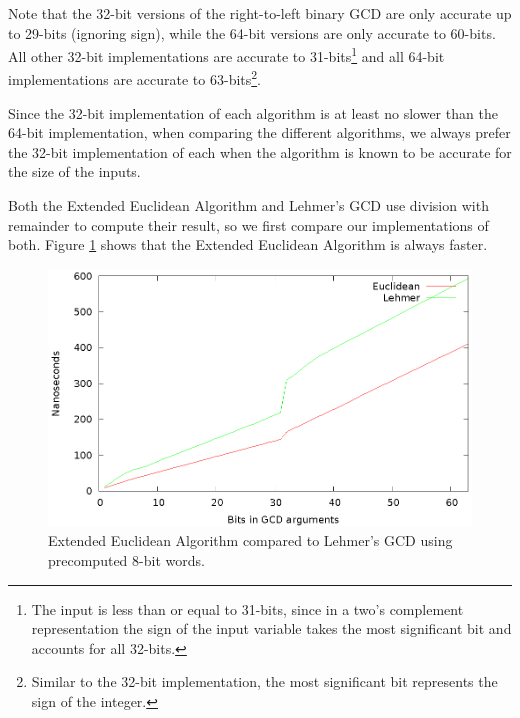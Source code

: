 \documentclass{ucalgthes1}
\theoremstyle{definition}
\begin{document}
Note that the 32-bit versions of the right-to-left binary GCD are only accurate up to 29-bits (ignoring sign), while the 64-bit versions are only accurate to 60-bits. All other 32-bit implementations are accurate to 31-bits\footnote{The input is less than or equal to 31-bits, since in a two's complement representation the sign of the input variable takes the most significant bit and accounts for all 32-bits.} and all 64-bit implementations are accurate to 63-bits\footnote{Similar to the 32-bit implementation, the most significant bit represents the sign of the integer.}.

Since the 32-bit implementation of each algorithm is at least no slower than the 64-bit implementation, when comparing the different algorithms, we always prefer the 32-bit implementation of each when the algorithm is known to be accurate for the size of the inputs.

Both the Extended Euclidean Algorithm and Lehmer's GCD use division with remainder to compute their result, so we first compare our implementations of both.  Figure \ref{fig:divrem-vs-lehmer} shows that the Extended Euclidean Algorithm is always faster.

\begin{figure}[H]
\centering
\includegraphics{divrem-vs-lehmer}
\caption{Extended Euclidean Algorithm compared to Lehmer's GCD using precomputed 8-bit words.}
\label{fig:divrem-vs-lehmer}
\end{figure}
\end{document}

